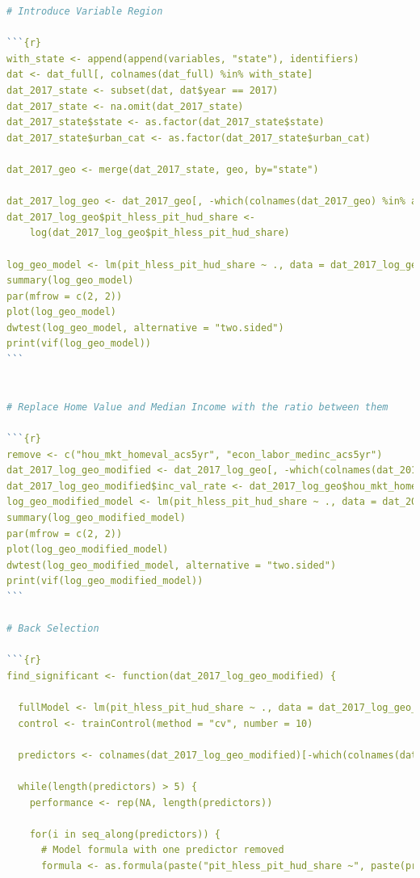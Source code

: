 \documentclass[12pt]{article}
\begin{document}
\begin{lstlisting}[language=R]
# Introduce Variable Region

```{r}
with_state <- append(append(variables, "state"), identifiers)
dat <- dat_full[, colnames(dat_full) %in% with_state]
dat_2017_state <- subset(dat, dat$year == 2017)
dat_2017_state <- na.omit(dat_2017_state)
dat_2017_state$state <- as.factor(dat_2017_state$state)
dat_2017_state$urban_cat <- as.factor(dat_2017_state$urban_cat)

dat_2017_geo <- merge(dat_2017_state, geo, by="state")
  
dat_2017_log_geo <- dat_2017_geo[, -which(colnames(dat_2017_geo) %in% append(identifiers, c("state", "Division")))]
dat_2017_log_geo$pit_hless_pit_hud_share <-
    log(dat_2017_log_geo$pit_hless_pit_hud_share)

log_geo_model <- lm(pit_hless_pit_hud_share ~ ., data = dat_2017_log_geo)
summary(log_geo_model)
par(mfrow = c(2, 2))
plot(log_geo_model)
dwtest(log_geo_model, alternative = "two.sided")
print(vif(log_geo_model))
```


# Replace Home Value and Median Income with the ratio between them

```{r}
remove <- c("hou_mkt_homeval_acs5yr", "econ_labor_medinc_acs5yr")
dat_2017_log_geo_modified <- dat_2017_log_geo[, -which(colnames(dat_2017_log_geo) %in% remove)]
dat_2017_log_geo_modified$inc_val_rate <- dat_2017_log_geo$hou_mkt_homeval_acs5yr / dat_2017_log_geo$econ_labor_medinc_acs5yr
log_geo_modified_model <- lm(pit_hless_pit_hud_share ~ ., data = dat_2017_log_geo_modified)
summary(log_geo_modified_model)
par(mfrow = c(2, 2))
plot(log_geo_modified_model)
dwtest(log_geo_modified_model, alternative = "two.sided")
print(vif(log_geo_modified_model))
```

# Back Selection

```{r}
find_significant <- function(dat_2017_log_geo_modified) {

  fullModel <- lm(pit_hless_pit_hud_share ~ ., data = dat_2017_log_geo_modified)
  control <- trainControl(method = "cv", number = 10)
  
  predictors <- colnames(dat_2017_log_geo_modified)[-which(colnames(dat_2017_log_geo_modified) == "pit_hless_pit_hud_share")]
  
  while(length(predictors) > 5) {
    performance <- rep(NA, length(predictors))
    
    for(i in seq_along(predictors)) {
      # Model formula with one predictor removed
      formula <- as.formula(paste("pit_hless_pit_hud_share ~", paste(predictors[-i], collapse = " + ")))
      

\end{lstlisting}
\end{document}
